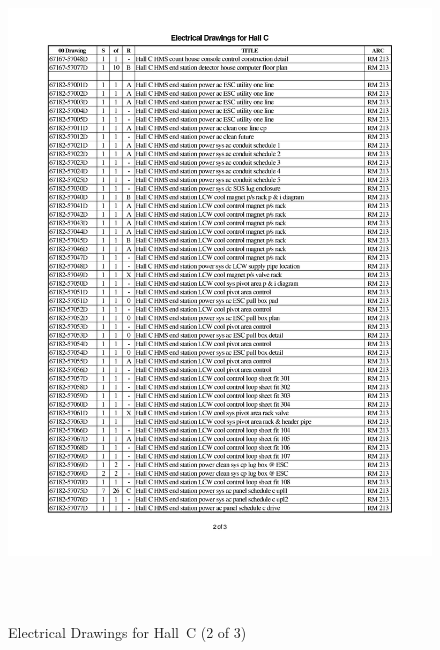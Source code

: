 {\clearpage
\begin{figure}
\begin{center}
\includegraphics[height=7in]{ele2p.pdf}
\caption{Electrical Drawings for Hall~C (2 of 3)}
\label{fig:elect_dwgs2}
\end{center}
\end{figure}

}
